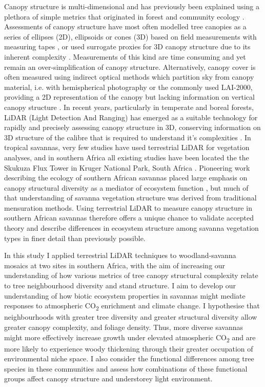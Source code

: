 \documentclass[11pt,a4paper]{article}
\begin{document}
Canopy structure is multi-dimensional and has previously been explained using a plethora of simple metrics that originated in forest and community ecology \citep{Kershaw2017}. Assessments of canopy structure have most often modelled tree canopies as a series of ellipses (2D), ellipsoids or cones (3D) based on field measurements with measuring tapes \citep{Jucker2015}, or used surrogate proxies for 3D canopy structure due to its inherent complexity \citep{Seidel2011}. Measurements of this kind are time consuming and yet remain an over-simplification of canopy structure. Alternatively, canopy cover is often measured using indirect optical methods which partition sky from canopy material, i.e. with hemispherical photography or the commonly used LAI-2000, providing a 2D representation of the canopy but lacking information on vertical canopy structure \citep{Jonckheere2004}. In recent years, particularly in temperate and boreal forests, LiDAR (Light Detection And Ranging) has emerged as a suitable technology for rapidly and precisely assessing canopy structure in 3D, conserving information on 3D structure of the calibre that is required to understand it's complexities \citep{Muir2018, Calders2020}. In tropical savannas, very few studies have used terrestrial LiDAR for vegetation analyses, and in southern Africa all existing studies have been located the the Skukuza Flux Tower in Kruger National Park, South Africa \citep{Muumbe2021}. Pioneering work describing the ecology of southern African savannas placed large emphasis on canopy structural diversity as a mediator of ecosystem function \citep{Solbrig1996}, but much of that understanding of savanna vegetation structure was derived from traditional mensuration methods. Using terrestrial LiDAR to measure canopy structure in southern African savannas therefore offers a unique chance to validate accepted theory and describe differences in ecosystem structure among savanna vegetation types in finer detail than previously possible.

In this study I applied terrestrial LiDAR techniques to woodland-savanna mosaics at two sites in southern Africa, with the aim of increasing our understanding of how various metrics of tree canopy structural complexity relate to tree neighbourhood diversity and stand structure. I aim to develop our understanding of how biotic ecosystem properties in savannas might mediate responses to atmospheric CO\textsubscript{2} enrichment and climate change. I hypothesise that neighbourhoods with greater tree diversity and greater structural diversity allow greater canopy complexity, and foliage density. Thus, more diverse savannas might more effectively increase growth under elevated atmospheric CO\textsubscript{2} and are more likely to experience woody thickening through their greater occupation of environmental niche space. I also consider the functional differences among tree species in these communities and assess how combinations of these functional groups affect canopy structure and understorey light environment.
\end{document}
